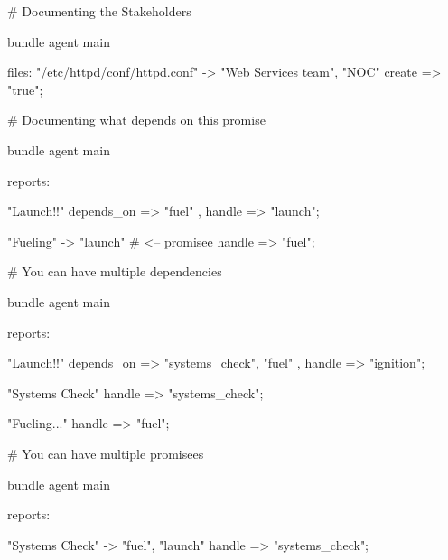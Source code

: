 \begin{codelisting}
\begin{code}
# Documenting the Stakeholders

bundle agent main
{

  files:
      "/etc/httpd/conf/httpd.conf" -> { "Web Services team", "NOC" }
        create  => "true";
}
\end{code}
\end{codelisting}
\begin{codelisting}
\begin{code}
# Documenting what depends on this promise

bundle agent main
{
  reports:

      "Launch!!"
        depends_on => { "fuel" },
        handle => "launch";

      "Fueling" -> { "launch" }   # <-- promisee
        handle => "fuel";
}

\end{code}
\end{codelisting}
\begin{codelisting}
\begin{code}
# You can have multiple dependencies

bundle agent main
{
  reports:

      "Launch!!"
        depends_on => { "systems_check", "fuel" },
        handle => "ignition";

      "Systems Check"
        handle => "systems_check";

      "Fueling..."
        handle => "fuel";

}
\end{code}
\end{codelisting}
\begin{codelisting}
\begin{code}
# You can have multiple promisees

bundle agent main
{
  reports:

      "Systems Check" -> { "fuel", "launch" }
        handle => "systems_check";
}
\end{code}
\end{codelisting}





